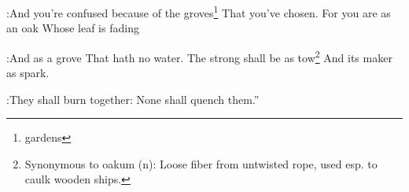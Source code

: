 \begin{enumerate*}[mode=unboxed]
:And you're confused because of the groves\footnote{gardens} That you've chosen.%
     For you are as an oak Whose leaf is fading%

:And as a grove That hath no water.%
     The strong shall be as tow\footnote{Synonymous to oakum (n): Loose fiber from untwisted rope, used esp. to caulk wooden ships.} And its maker as spark.%

:They shall burn together: None shall quench them.''%
\end{enumerate*}
